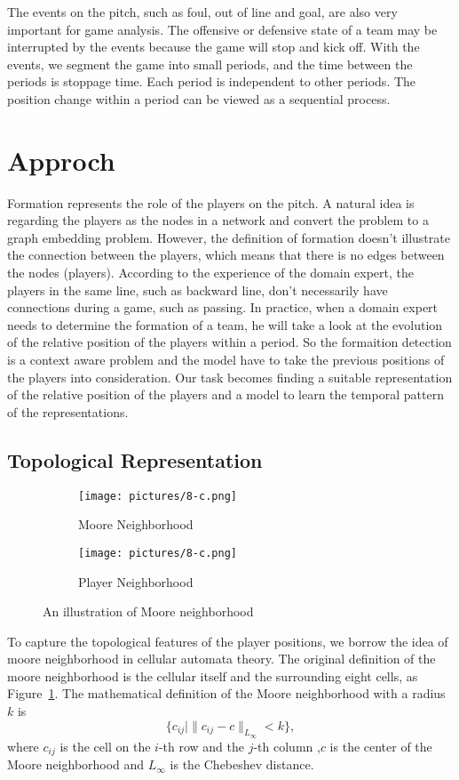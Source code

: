 \documentclass{article}
\begin{document}
The events on the pitch, such as foul, out of line and goal, are also very important for game analysis. The offensive or defensive state of a team may be interrupted by the events because the game will stop and kick off. With the events, we segment the game into small periods, and the time between the periods is stoppage time. Each period is independent to other periods. The position change within a period can be viewed as a sequential process.

\section{Approch}
Formation represents the role of the players on the pitch. A natural idea is regarding the players as the nodes in a network and convert the problem to a graph embedding problem. However, the definition of formation doesn't illustrate the connection between the players, which means that there is no edges between the nodes (players). According to the experience of the domain expert, the players in the same line, such as backward line, don't necessarily have connections during a game, such as passing. In practice, when a domain expert needs to determine the formation of a team, he will take a look at the evolution of the relative position of the players within a period. So the formaition detection is a context aware problem and the model have to take the previous positions of the players into consideration. Our task becomes finding a suitable representation of the relative position of the players and a model to learn the temporal pattern of the representations.

\subsection{Topological Representation}
\begin{figure}
    \centering
    \begin{subfigure}[b]{0.2\textwidth}
        \texttt{[image: pictures/8-c.png]}
        \caption{Moore Neighborhood}
        \label{fig:moore1}
    \end{subfigure}
    \begin{subfigure}[b]{0.2\textwidth}
        \texttt{[image: pictures/8-c.png]}
        \caption{Player Neighborhood}
        \label{fig:moore2}
    \end{subfigure}
    \caption{An illustration of Moore neighborhood}\label{fig:moores}
\end{figure}
To capture the topological features of the player positions, we borrow the idea of moore neighborhood in cellular automata theory. 
The original definition of the moore neighborhood is the cellular itself and the surrounding eight cells, as Figure~\ref{fig:moore1}. The mathematical definition of the Moore neighborhood with a radius $k$ is
\begin{equation}
    \{c_{ij}| \|c_{ij}-c\|_{L_{\infty}}<k\},
\end{equation}
where $c_{ij}$ is the cell on the $i$-th row and the $j$-th column ,$c$ is the center of the Moore neighborhood and $L_{\infty}$ is the Chebeshev distance.
\end{document}
